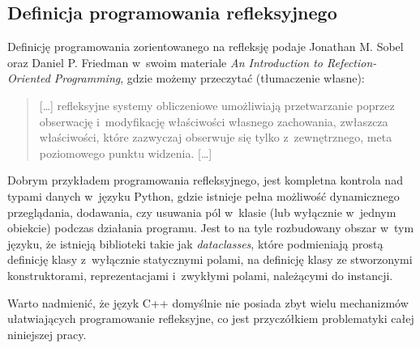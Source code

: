 \documentclass[12pt]{article}
\newcommand{\nonpl}[1]{{\it #1}}
\begin{document}
{		{
			\subsection{Definicja programowania refleksyjnego}

			Definicję programowania zorientowanego na refleksję podaje Jonathan M. Sobel oraz Daniel P. Friedman
			w~swoim materiale \nonpl{An Introduction to Refection-Oriented Programming}\cite{reflection_definition},
			gdzie możemy przeczytać (tłumaczenie własne):

			\begin{quotation}
				[\ldots] refleksyjne systemy obliczeniowe umożliwiają przetwarzanie poprzez obserwację i~modyfikację
				właściwości własnego zachowania, zwłaszcza właściwości, które zazwyczaj obserwuje się tylko z~zewnętrznego,
				meta poziomowego punktu widzenia. [\ldots]
			\end{quotation}

			Dobrym przykładem programowania refleksyjnego, jest kompletna kontrola nad typami danych w~języku Python,
			gdzie istnieje pełna możliwość dynamicznego przeglądania, dodawania, czy usuwania pól w~klasie (lub wyłącznie w~jednym obiekcie)
			podczas działania programu. Jest to na tyle rozbudowany obszar w~tym języku, że istnieją biblioteki takie jak
			\nonpl{dataclasses}\cite{python_dataclass}, które podmieniają prostą definicję klasy z~wyłącznie statycznymi polami,
			na definicję klasy ze stworzonymi konstruktorami, reprezentacjami i~zwykłymi polami, należącymi do instancji.

			Warto nadmienić, że język C++ domyślnie nie posiada zbyt wielu mechanizmów ułatwiających programowanie refleksyjne,
			co jest przyczółkiem problematyki całej niniejszej pracy.
		}
	}
\end{document}
